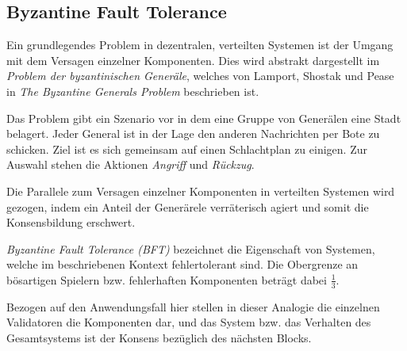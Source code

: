 \subsection{Byzantine Fault Tolerance}

Ein grundlegendes Problem in dezentralen, verteilten Systemen ist der Umgang mit dem Versagen einzelner Komponenten. 
Dies wird abstrakt dargestellt im
\textit{Problem der byzantinischen Generäle}, welches von Lamport, Shostak und Pease in \textit{The Byzantine Generals Problem} \cite{bgp82} beschrieben ist.

Das Problem gibt ein Szenario vor in dem eine Gruppe von Gener\"alen eine Stadt belagert. Jeder General ist in der Lage den anderen Nachrichten per Bote zu schicken. Ziel ist es sich gemeinsam auf einen Schlachtplan zu einigen. Zur Auswahl stehen die Aktionen \textit{Angriff} und \textit{Rückzug}. 

Die Parallele zum Versagen einzelner Komponenten in verteilten Systemen wird gezogen, indem ein Anteil der Generärele verräterisch agiert und somit die Konsensbildung erschwert.

\textit{Byzantine Fault Tolerance (BFT)} bezeichnet die Eigenschaft von Systemen, welche im beschriebenen Kontext fehlertolerant sind. Die Obergrenze an bösartigen Spielern bzw. fehlerhaften Komponenten beträgt dabei $\frac{1}{3}$.

Bezogen auf den Anwendungsfall hier stellen in dieser Analogie die einzelnen Validatoren die Komponenten dar, und das System bzw. das Verhalten des Gesamtsystems ist der Konsens bezüglich des nächsten Blocks.
